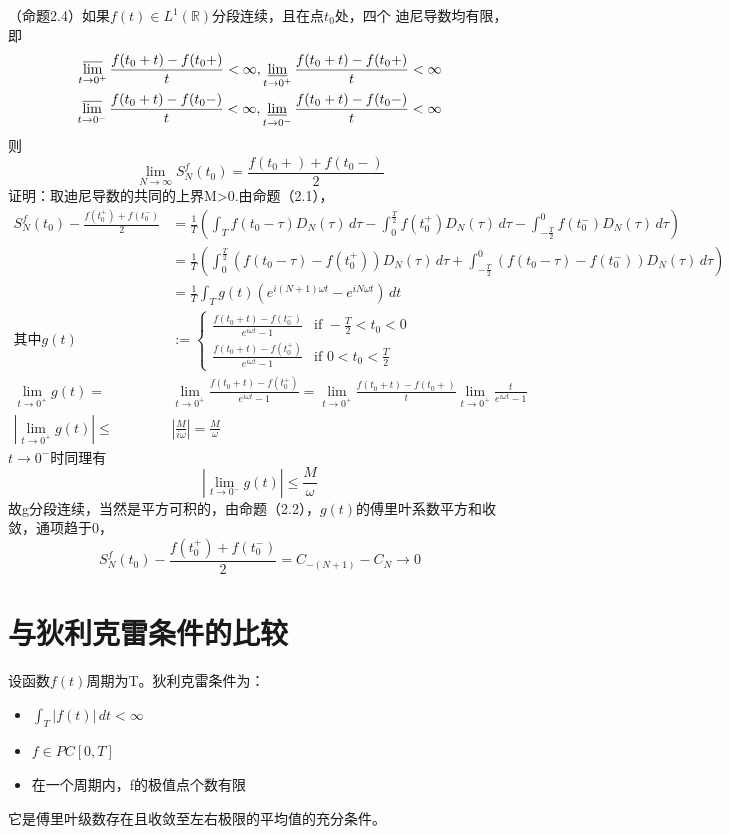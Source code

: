 \documentclass{ctexart}
\begin{document}
（命题2.4）如果$f(t)\in L^1(\mathbb{R})$分段连续，且在点$t_0$处，四个
迪尼导数均有限，即
\begin{align*}
    \varlimsup_{t \to 0^+}\frac{f(t_0+t)-f(t_0+)}{t}<\infty,\varliminf_{t \to 0^+}\frac{f(t_0+t)-f(t_0+)}{t}<\infty \\
    \varlimsup_{t \to 0^-}\frac{f(t_0+t)-f(t_0-)}{t}<\infty,\varliminf_{t \to 0^-}\frac{f(t_0+t)-f(t_0-)}{t}<\infty \\
\end{align*}
则\[\lim_{N\to\infty}S_N^f(t_0)=\frac{f(t_0+)+f(t_0-)}{2}\]
证明：取迪尼导数的共同的上界M>0.由命题（2.1），
\begin{align*}
    S_N^f(t_0)-\frac{f(t_0^+)+f(t_0^-)}{2} & =\frac{1}{T}(\int_{T}f(t_0-\tau)D_N(\tau)\,d\tau-\int_{0}^{\frac{T}{2}}f(t_0^+)D_N(\tau)\,d\tau-\int_{-\frac{T}{2}}^{0}f(t_0^-)D_N(\tau)\,d\tau) \\
                                           & =\frac{1}{T}(\int_{0}^{\frac{T}{2}}(f(t_0-\tau)-f(t_0^+))D_N(\tau)\,d\tau+\int_{-\frac{T}{2}}^{0}(f(t_0-\tau)-f(t_0^-))D_N(\tau)\,d\tau)         \\
                                           & =\frac{1}{T}\int_{T}g(t)(e^{i(N+1)\omega t}-e^{iN\omega t})\,dt                                                                                  \\
    \text{其中}g(t)                          & :=\begin{cases}
                                                   \frac{f(t_0+t)-f(t_0^-)}{e^{i\omega t}-1} & \text{if }-\frac{T}{2}<t_0<0 \\
                                                   \frac{f(t_0+t)-f(t_0^+)}{e^{i\omega t}-1} & \text{if }0<t_0<\frac{T}{2}
                                               \end{cases}                                                      \\
    \lim_{t\to 0^+}g(t)=                   & \lim_{t\to 0^+}\frac{f(t_0+t)-f(t_0^+)}{e^{i\omega t}-1}=\lim_{t\to 0^+}\frac{f(t_0+t)-f(t_0+)}{t}\lim_{t\to 0^+}\frac{t}{e^{i\omega t}-1}       \\
    |\lim_{t\to 0^+}g(t)|\leq              & |\frac{M}{i\omega}|=\frac{M}{\omega}
\end{align*}
$t\to 0^-$时同理有\[|\lim_{t\to 0^-}g(t)|\leq\frac{M}{\omega} \]
故g分段连续，当然是平方可积的，由命题（2.2），$g(t)$的傅里叶系数平方和收敛，通项趋于0，
\[S_N^f(t_0)-\frac{f(t_0^+)+f(t_0^-)}{2}=C_{-(N+1)}-C_N\to 0\]

\section{与狄利克雷条件的比较}
设函数$f(t)$周期为T。狄利克雷条件为：\begin{itemize}
    \item $\int_{T}|f(t)|\,dt<\infty$
    \item $f\in PC[0,T]$
    \item 在一个周期内，f的极值点个数有限
\end{itemize}
它是傅里叶级数存在且收敛至左右极限的平均值的充分条件。
\end{document}
